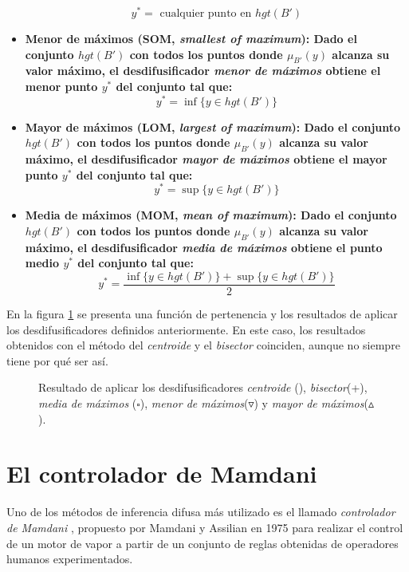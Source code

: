 \begin{itemize}
  \begin{equation}
	y^* = \text{ cualquier punto en } hgt(B')
  \end{equation}
  \item\bfseries Menor de máximos (SOM, \emph{smallest of maximum}): \normalfont Dado el conjunto $hgt(B')$ con todos los puntos donde $\mu_{B'}(y)$ alcanza su valor máximo, el desdifusificador \emph{menor de máximos} obtiene el menor punto $y^*$ del conjunto tal que:
  \begin{equation}
	y^* = \inf\{y \in hgt(B')\}
  \end{equation}
  \item\bfseries Mayor de máximos (LOM, \emph{largest of maximum}): \normalfont Dado el conjunto $hgt(B')$ con todos los puntos donde $\mu_{B'}(y)$ alcanza su valor máximo, el desdifusificador \emph{mayor de máximos} obtiene el mayor punto $y^*$ del conjunto tal que:
   \begin{equation}
  	y^* = \sup\{y \in hgt(B')\}
    \end{equation}
   \item\bfseries Media de máximos (MOM, \emph{mean of maximum}): \normalfont Dado el conjunto $hgt(B')$ con todos los puntos donde $\mu_{B'}(y)$ alcanza su valor máximo, el desdifusificador \emph{media de máximos} obtiene el punto medio $y^*$ del conjunto tal que:
   \begin{equation}
     	y^* = \frac{ \inf\{y \in hgt(B')\} + \sup\{y \in hgt(B')\}}{2}
   \end{equation}
\end{itemize}
En la figura \ref{fig:defuzzifiers} se presenta una función de pertenencia y los resultados de aplicar los desdifusificadores definidos anteriormente. En este caso, los resultados obtenidos con el método del \emph{centroide} y el \emph{bisector} coinciden, aunque no siempre tiene por qué ser así.
\begin{figure}[t]
	\centering
	\setlength\figureheight{5.5cm}
	\setlength\figurewidth{12cm}
	
	\caption{Resultado de aplicar los desdifusificadores \emph{centroide} (\textasteriskcentered), \emph{bisector}(+), \emph{media de máximos} ($\square$), \emph{menor de máximos}($\triangledown$) y \emph{mayor de máximos}($\vartriangle$).}
	\label{fig:defuzzifiers}
\end{figure}

\section{El controlador de Mamdani}\label{sec:mamdani-controller}
Uno de los métodos de inferencia difusa más utilizado es el llamado \emph{controlador de Mamdani} \cite{Mamdani1975}, propuesto por Mamdani y Assilian en 1975 para realizar el control de un motor de vapor a partir de un conjunto de reglas obtenidas de operadores humanos experimentados.

